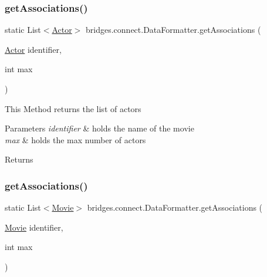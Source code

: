 \subsubsection{\texorpdfstring{getAssociations()}{getAssociations()}\hspace{0.1cm}{\footnotesize\ttfamily [4/5]}}
{\footnotesize\ttfamily static List$<$\mbox{\hyperlink{classbridges_1_1data__src__dependent_1_1_actor}{Actor}}$>$ bridges.\+connect.\+Data\+Formatter.\+get\+Associations (\begin{DoxyParamCaption}\item[{\mbox{\hyperlink{classbridges_1_1data__src__dependent_1_1_actor}{Actor}}}]{identifier,  }\item[{int}]{max }\end{DoxyParamCaption})\hspace{0.3cm}{\ttfamily [static]}}

This Method returns the list of actors 
\begin{DoxyParams}{Parameters}
{\em identifier} & holds the name of the movie \\
\hline
{\em max} & holds the max number of actors \\
\hline
\end{DoxyParams}
\begin{DoxyReturn}{Returns}

\end{DoxyReturn}
\mbox{\label{classbridges_1_1connect_1_1_data_formatter_ad0377b692c07836fb1016e5fb296e79c}} 
\subsubsection{\texorpdfstring{getAssociations()}{getAssociations()}\hspace{0.1cm}{\footnotesize\ttfamily [5/5]}}
{\footnotesize\ttfamily static List$<$\mbox{\hyperlink{classbridges_1_1data__src__dependent_1_1_movie}{Movie}}$>$ bridges.\+connect.\+Data\+Formatter.\+get\+Associations (\begin{DoxyParamCaption}\item[{\mbox{\hyperlink{classbridges_1_1data__src__dependent_1_1_movie}{Movie}}}]{identifier,  }\item[{int}]{max }\end{DoxyParamCaption})\hspace{0.3cm}{\ttfamily [static]}}

